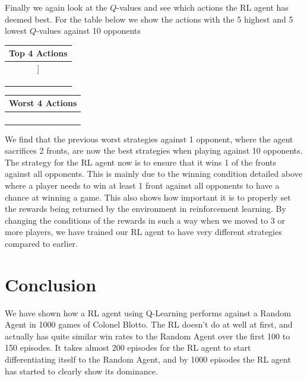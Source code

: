 \documentclass[11pt, oneside]{article}   	%
\begin{document}
Finally we again look at the $Q$-values and see which actions the RL agent has deemed best. For the table below we show the actions with the 5  highest and 5 lowest $Q$-values against 10 opponents

\hfill 

\begin{center}
\begin{tabular}{ |c| } 
 \hline
 \textbf{Top 4 Actions} \\ 
 \hline
[10, 0, 0]] \\ 
 \hline
 [5, 0, 5] \\ 
 \hline
[9, 1, 0]\\
 \hline
[0, 10, 0]\\
 \hline
\end{tabular}
\quad
\begin{tabular}{ |c| } 
 \hline
\textbf{Worst 4 Actions} \\ 
 \hline
[4, 4, 2]\\ 
 \hline
[0, 5, 5] \\
 \hline
 [3, 3, 4]\\
 \hline
 [2, 5, 3]\\

 \hline
\end{tabular}

\end{center}

We find that the previous worst strategies against 1 opponent, where the agent sacrifices 2 fronts, are now the best strategies when playing against 10 opponents. The strategy for the RL agent now is to ensure that it wins 1 of the fronts against all opponents. This is mainly due to the winning condition detailed above where a player needs to win at least 1 front against all opponents to have a chance at winning a game. This also shows how important it is to properly set the rewards being returned by the environment in reinforcement learning. By changing the conditions of the rewards in such a way when we moved to 3 or more players, we have trained our RL agent to have very different strategies compared to earlier.

\section{Conclusion}

We have shown how a RL agent using Q-Learning performs against a Random Agent in 1000 games of Colonel Blotto. The RL doesn't do at well at first, and actually has quite similar win rates to the Random Agent over the first 100 to 150 episodes. It takes almost 200 episodes for the RL agent to start differentiating itself to the Random Agent, and by 1000 episodes the RL agent has started to clearly show its dominance.
\end{document}
